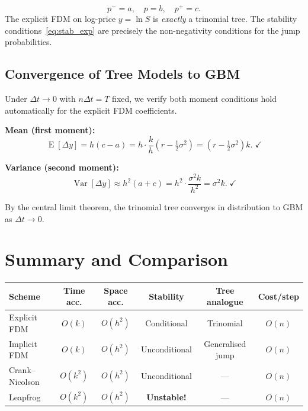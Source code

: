 \documentclass[12pt,a4paper]{article}
\theoremstyle{plain}
\theoremstyle{definition}
\theoremstyle{remark}
\newcommand{\Var}{\operatorname{Var}}
\newcommand{\E}{\operatorname{E}}
\newcommand{\dt}{\Delta t}
\begin{document}
\begin{keybox}
\[
  p^{-}=a,\quad p=b,\quad p^{+}=c.
\]
The explicit FDM on log-price $y=\ln S$ is \emph{exactly} a trinomial
tree.  The stability conditions~\eqref{eq:stab_exp} are precisely the
non-negativity conditions for the jump probabilities.
\end{keybox}

\subsection{Convergence of Tree Models to GBM}

Under $\dt\to0$ with $n\dt=T$ fixed, we verify both moment conditions
hold automatically for the explicit FDM coefficients.

\textbf{Mean (first moment):}
\[
  \E[\Delta y]=h(c-a)
  =h\cdot\frac{k}{h}\!\left(r-\tfrac{1}{2}\sigma^{2}\right)
  =\left(r-\tfrac{1}{2}\sigma^{2}\right)k.\;\checkmark
\]

\textbf{Variance (second moment):}
\[
  \Var[\Delta y]\approx h^{2}(a+c)
  =h^{2}\cdot\frac{\sigma^{2}k}{h^{2}}=\sigma^{2}k.\;\checkmark
\]

By the central limit theorem, the trinomial tree converges in
distribution to GBM as $\dt\to0$.

\section{Summary and Comparison}

\begin{center}
\renewcommand{\arraystretch}{1.6}
\begin{tabular}{lccccc}
  \toprule
  \textbf{Scheme} & \textbf{Time acc.} & \textbf{Space acc.}
    & \textbf{Stability} & \textbf{Tree analogue} & \textbf{Cost/step}\\
  \midrule
  Explicit FDM    & $O(k)$   & $O(h^{2})$ & Conditional   & Trinomial & $O(n)$ \\
  Implicit FDM    & $O(k)$   & $O(h^{2})$ & Unconditional & Generalised jump & $O(n)$ \\
  Crank--Nicolson & $O(k^{2})$& $O(h^{2})$& Unconditional & ---       & $O(n)$ \\
  Leapfrog        & $O(k^{2})$& $O(h^{2})$& \textbf{Unstable!} & ---  & $O(n)$ \\
  \bottomrule
\end{tabular}
\end{center}
\end{document}
